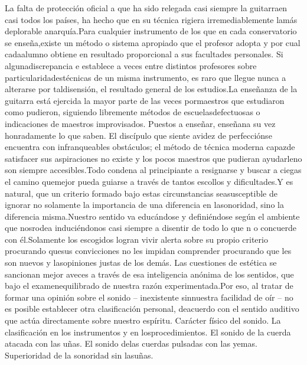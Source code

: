 \documentclass[
10pt, %
a4paper, %
oneside, %
headinclude,footinclude, %
BCOR5mm, %
]{scrartcl}
\begin{document}
{La falta de protección oficial a que ha sido relegada casi siempre la guitarraen casi todos los países, ha hecho que en su técnica rigiera irremediablemente lamás deplorable anarquía.Para cualquier instrumento de los que en cada conservatorio se enseña,existe un método o sistema apropiado que el profesor adopta y por cual cadaalumno obtiene en resultado proporcional a sus facultades personales. Si algunadiscrepancia e establece a veces entre distintos profesores sobre particularidadestécnicas de un misma instrumento, es raro que llegue nunca a alterarse por taldisensión, el resultado general de los estudios.La enseñanza de la guitarra está ejercida la mayor parte de las veces pormaestros que estudiaron como pudieron, siguiendo libremente métodos de escuelasdefectuosas o indicaciones de maestros improvisados. Puestos a enseñar, enseñana su vez honradamente lo que saben. El discípulo que siente avidez de perfecciónse encuentra con infranqueables obstáculos; el método de técnica moderna capazde satisfacer sus aspiraciones no existe y los pocos maestros que pudieran ayudarleno son siempre accesibles.Todo condena al principiante a resignarse y buscar a ciegas el camino quemejor pueda guiarse a través de tantos escollos y dificultades.Y es natural, que un criterio formado bajo estas circunstancias seasusceptible de ignorar no solamente la importancia de una diferencia en lasonoridad, sino la diferencia misma.Nuestro sentido va educándose y definiéndose según el ambiente que nosrodea induciéndonos casi siempre a disentir de todo lo que n o concuerde con él.Solamente los escogidos logran vivir alerta sobre su propio criterio procurando quesus convicciones no les impidan comprender procurando que les son nuevos y lasopiniones justas de los demás. Las cuestiones de estética se sancionan mejor aveces a través de esa inteligencia anónima de los sentidos, que bajo el examenequilibrado de nuestra razón experimentada.Por eso, al tratar de formar una opinión sobre el sonido – inexistente sinnuestra facilidad de oír – no es posible establecer otra clasificación personal, deacuerdo con el sentido auditivo que actúa directamente sobre nuestro espíritu. Carácter físico del sonido. La clasificación en los instrumentos y en losprocedimientos. El sonido de la cuerda atacada con las uñas. El sonido delas cuerdas pulsadas con las yemas. Superioridad de la sonoridad sin lasuñas.
}
\end{document}
